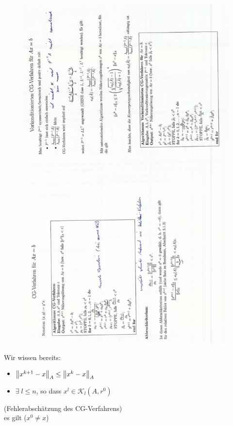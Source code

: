 \begin{figure}
  \centering
  \includegraphics[width=\textwidth]{figures/cg_handout.png}
\end{figure}
Wir wissen bereits:
\begin{itemize}
  \item $\left\lVert x^{k+1} - x \right\rVert_A \leq \left\lVert x^k - x \right\rVert_A$
  \item $\exists\; l \leq n$, so dass $x^l \in \mathcal{K}_l(A,r^0)$
\end{itemize}
\satz (Fehlerabschätzung des CG-Verfahrens)\\
es gilt ($x^0 \neq x$)
